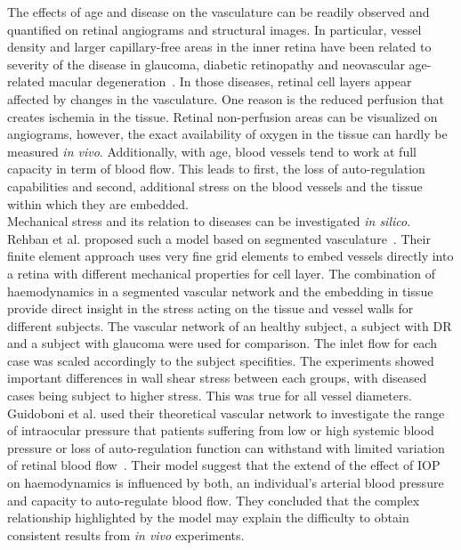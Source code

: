 \documentclass[12pt,a4paper]{journal}
\begin{document}
The effects of age and disease on the vasculature can be readily observed and quantified on retinal angiograms and structural images.
In particular, vessel density and larger capillary-free areas in the inner retina have been related to severity of the disease in glaucoma, diabetic retinopathy and neovascular age-related macular degeneration~\cite{AlSheikh_2016, Rao_2020, Yuan_2020}.
In those diseases, retinal cell layers appear affected by changes in the vasculature.
One reason is the reduced perfusion that creates ischemia in the tissue.
Retinal non-perfusion areas can be visualized on angiograms, however, the exact availability of oxygen in the tissue can hardly be measured \textit{in vivo}.
Additionally, with age, blood vessels tend to work at full capacity in term of blood flow.
This leads to first, the loss of auto-regulation capabilities and second, additional stress on the blood vessels and the tissue within which they are embedded.\\
Mechanical stress and its relation to diseases can be investigated \textit{in silico}.
Rehban et al. proposed such a model based on segmented vasculature~\cite{Rebhan_2019}.
Their finite element approach uses very fine grid elements to embed vessels directly into a retina with different mechanical properties for cell layer.
The combination of haemodynamics in a segmented vascular network and the embedding in tissue provide direct insight in the stress acting on the tissue and vessel walls for different subjects.
The vascular network of an healthy subject, a subject with DR and a subject with glaucoma were used for comparison.
The inlet flow for each case was scaled accordingly to the subject specifities.
The experiments showed important differences in wall shear stress between each groups, with diseased cases being subject to higher stress.
This was true for all vessel diameters.\\
Guidoboni et al. used their theoretical vascular network to investigate the range of intraocular pressure that patients suffering from low or high systemic blood pressure or loss of auto-regulation function can withstand with limited variation of retinal blood flow~\cite{Guidoboni_2014a}.
Their model suggest that the extend of the effect of IOP on haemodynamics is influenced by both, an individual's arterial blood pressure and capacity to auto-regulate blood flow.
They concluded that the complex relationship highlighted by the model may explain the difficulty to obtain consistent results from \textit{in vivo} experiments.
\end{document}
